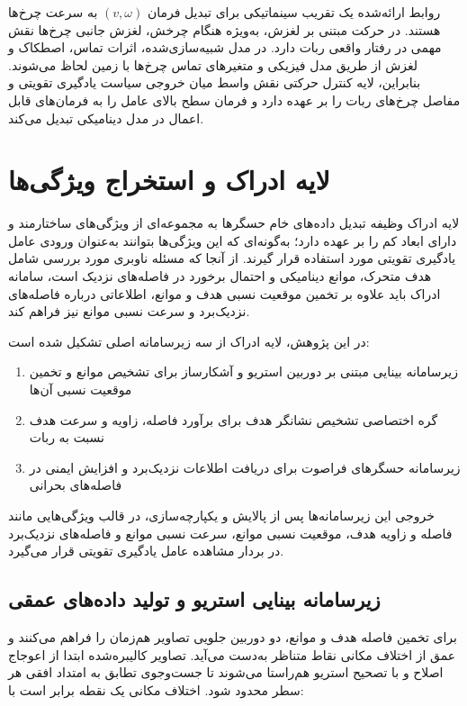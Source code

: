 روابط ارائه‌شده یک تقریب سینماتیکی برای تبدیل فرمان \((v,\omega)\) به سرعت چرخ‌ها هستند. در حرکت مبتنی بر لغزش، به‌ویژه هنگام چرخش، لغزش جانبی چرخ‌ها نقش مهمی در رفتار واقعی ربات دارد. در مدل شبیه‌سازی‌شده، اثرات تماس، اصطکاک و لغزش از طریق مدل فیزیکی  و متغیرهای تماس چرخ‌ها با زمین لحاظ می‌شوند. بنابراین، لایه کنترل حرکتی نقش واسط میان خروجی سیاست یادگیری تقویتی و مفاصل چرخ‌های ربات را بر عهده دارد و فرمان سطح بالای عامل را به فرمان‌های قابل اعمال در مدل دینامیکی تبدیل می‌کند.

\section{لایه ادراک و استخراج ویژگی‌ها}
\label{sec:perception_layer}

لایه ادراک وظیفه تبدیل داده‌های خام حسگرها به مجموعه‌ای از ویژگی‌های ساختارمند و دارای ابعاد کم را بر عهده دارد؛ به‌گونه‌ای که این ویژگی‌ها بتوانند به‌عنوان ورودی عامل یادگیری تقویتی مورد استفاده قرار گیرند. از آنجا که مسئله ناوبری مورد بررسی شامل هدف متحرک، موانع دینامیکی و احتمال برخورد در فاصله‌های نزدیک است، سامانه ادراک باید علاوه بر تخمین موقعیت نسبی هدف و موانع، اطلاعاتی درباره فاصله‌های نزدیک‌برد و سرعت نسبی موانع نیز فراهم کند.

در این پژوهش، لایه ادراک از سه زیرسامانه اصلی تشکیل شده است:
\begin{enumerate}
	\item زیرسامانه بینایی مبتنی بر دوربین استریو و آشکارساز  برای تشخیص موانع و تخمین موقعیت نسبی آن‌ها
	\item گره اختصاصی تشخیص نشانگر هدف برای برآورد فاصله، زاویه و سرعت هدف نسبت به ربات
	\item زیرسامانه حسگرهای فراصوت برای دریافت اطلاعات نزدیک‌برد و افزایش ایمنی در فاصله‌های بحرانی
\end{enumerate}

خروجی این زیرسامانه‌ها پس از پالایش و یکپارچه‌سازی، در قالب ویژگی‌هایی مانند فاصله و زاویه هدف، موقعیت نسبی موانع، سرعت نسبی موانع و فاصله‌های نزدیک‌برد در بردار مشاهده عامل یادگیری تقویتی قرار می‌گیرد.

\subsection{زیرسامانه بینایی استریو و تولید داده‌های عمقی}
\label{subsec:stereo_depth}

برای تخمین فاصله هدف و موانع، دو دوربین جلویی تصاویر هم‌زمان را فراهم می‌کنند و عمق از اختلاف مکانی%
نقاط متناظر به‌دست می‌آید. تصاویر کالیبره‌شده ابتدا از اعوجاج اصلاح و با تصحیح استریو%
هم‌راستا می‌شوند تا جست‌وجوی تطابق به امتداد افقی هر سطر محدود شود. اختلاف مکانی یک نقطه برابر است با:

